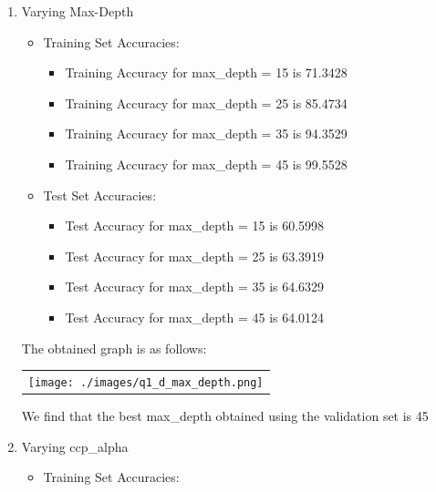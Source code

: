 \begin{enumerate}[label=(\alph*)]
          \begin{enumerate}[label=\roman*.]
              \item Varying Max-Depth
                    \begin{itemize}
                        \item Training Set Accuracies:
                              \begin{itemize}
                                  \item Training Accuracy for max\_depth = 15 is 71.3428
                                  \item Training Accuracy for max\_depth = 25 is 85.4734
                                  \item Training Accuracy for max\_depth = 35 is 94.3529
                                  \item Training Accuracy for max\_depth = 45 is 99.5528
                              \end{itemize}
                        \item Test Set Accuracies:
                              \begin{itemize}
                                  \item Test Accuracy for max\_depth = 15 is 60.5998
                                  \item Test Accuracy for max\_depth = 25 is 63.3919
                                  \item Test Accuracy for max\_depth = 35 is 64.6329
                                  \item Test Accuracy for max\_depth = 45 is 64.0124
                              \end{itemize}
                    \end{itemize}
                    \newpage
                    The obtained graph is as follows:
                    \begin{center}
                        \begin{tabular}{c}
                            \texttt{[image: ./images/q1\_d\_max\_depth.png]}
                        \end{tabular}
                    \end{center}
                    We find that the best max\_depth obtained using the validation set is 45
              \item Varying ccp\_alpha
                    \begin{itemize}
                        \item Training Set Accuracies:

\end{itemize}
\end{enumerate}
\end{enumerate}
